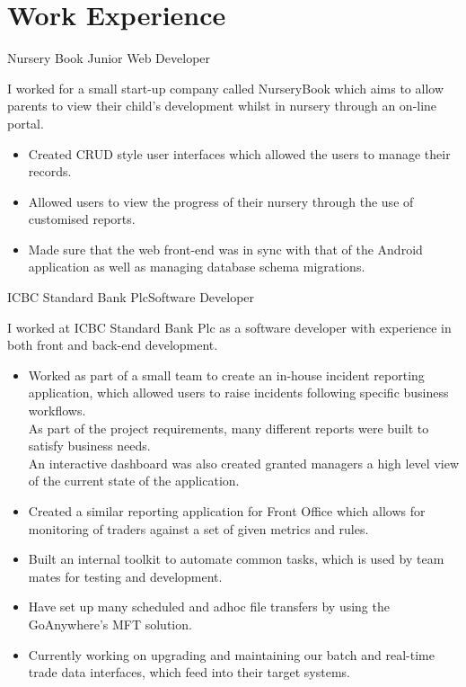 \documentclass[10pt,a4paper]{moderncv}
\begin{document}
    \section{Work Experience}
    {Nursery Book}
    {Junior Web Developer}
    {}
    {}
    {
    I worked for a small start-up company called NurseryBook which aims to allow parents to view their child's development whilst in nursery through an on-line portal.
    \begin{itemize}
        \item Created CRUD style user interfaces which allowed the users to manage their records.
        \item Allowed users to view the progress of their nursery through the use of customised reports.
        \item Made sure that the web front-end was in sync with that of the Android application as well as managing database schema migrations.
    \end{itemize}
    }

    {ICBC Standard Bank Plc}{Software Developer}{}{}
    {
    I worked at ICBC Standard Bank Plc as a software developer with experience in both front and back-end development.
    \begin{itemize}
        \item Worked as part of a small team to create an in-house incident reporting application, which allowed users to raise incidents following specific business workflows.\\
        As part of the project requirements, many different reports were built to satisfy business needs.\\
        An interactive dashboard was also created granted managers a high level view of the current state of the application.\\
        \item Created a similar reporting application for Front Office which allows for monitoring of traders against a set of given metrics and rules.
        \item Built an internal toolkit to automate common tasks, which is used by team mates for testing and development.
        \item Have set up many scheduled and adhoc file transfers by using the GoAnywhere's MFT solution.
        \item Currently working on upgrading and maintaining our batch and real-time trade data interfaces, which feed into their target systems.
    \end{itemize}
    }
\end{document}

